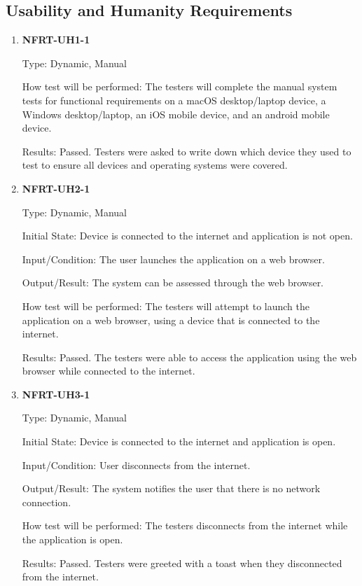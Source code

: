 \documentclass[12pt, titlepage]{article}
\begin{document}
\subsection{Usability and Humanity Requirements}
\begin{enumerate}
	\item \textbf{NFRT-UH1-1}

	      Type: Dynamic, Manual

	      How test will be performed: The testers will complete the manual system tests for functional
	      requirements on a macOS desktop/laptop device, a Windows desktop/laptop, an iOS mobile device, and
	      an android mobile device.

	      Results: Passed. Testers were asked to write down which device they used to test to ensure all
	      devices and operating systems were covered.

	\item \textbf{NFRT-UH2-1}

	      Type: Dynamic, Manual

	      Initial State: Device is connected to the internet and application is not open.

	      Input/Condition: The user launches the application on a web browser.

	      Output/Result: The system can be assessed through the web browser.

	      How test will be performed: The testers will attempt to launch the application on a web browser,
	      using a device that is connected to the internet.

	      Results: Passed. The testers were able to access the application using the web browser while
	      connected to the internet.

	\item \textbf{NFRT-UH3-1}

	      Type: Dynamic, Manual

	      Initial State: Device is connected to the internet and application is open.

	      Input/Condition: User disconnects from the internet.

	      Output/Result: The system notifies the user that there is no network connection.

	      How test will be performed: The testers disconnects from the internet while the application is
	      open.

	      Results: Passed. Testers were greeted with a toast when they disconnected from the internet.

\end{enumerate}
\end{document}

